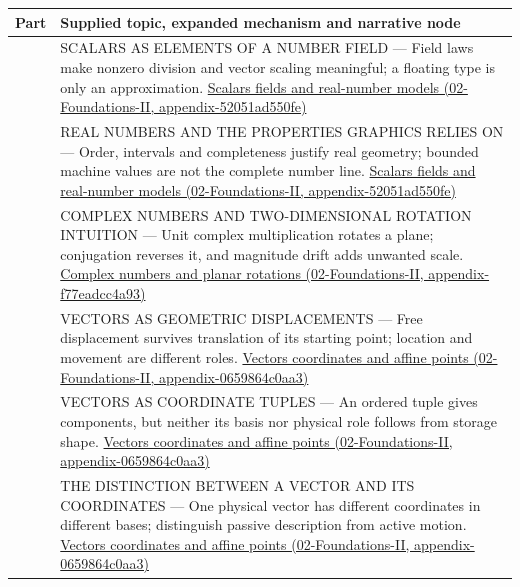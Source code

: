 {\def\LTcaptype{none} %
\begin{longtable}[]{@{}
  >{\raggedright\arraybackslash}p{}
  >{\raggedright\arraybackslash}p{}@{}}
\toprule\noalign{}
\begin{minipage}[b]{\linewidth}\raggedright
Part
\end{minipage} & \begin{minipage}[b]{\linewidth}\raggedright
Supplied topic, expanded mechanism and narrative node
\end{minipage} \\
\midrule\noalign{}
\endhead
\bottomrule\noalign{}
\endlastfoot
501 & SCALARS AS ELEMENTS OF A NUMBER FIELD --- Field laws make nonzero division and vector scaling meaningful; a floating type is only an approximation. \href{../02-Foundations-II/main.pdf\#nameddest=appendix-52051ad550fe}{Scalars fields and real-number models (02-Foundations-II, appendix-52051ad550fe)} \\
502 & REAL NUMBERS AND THE PROPERTIES GRAPHICS RELIES ON --- Order, intervals and completeness justify real geometry; bounded machine values are not the complete number line. \href{../02-Foundations-II/main.pdf\#nameddest=appendix-52051ad550fe}{Scalars fields and real-number models (02-Foundations-II, appendix-52051ad550fe)} \\
503 & COMPLEX NUMBERS AND TWO-DIMENSIONAL ROTATION INTUITION --- Unit complex multiplication rotates a plane; conjugation reverses it, and magnitude drift adds unwanted scale. \href{../02-Foundations-II/main.pdf\#nameddest=appendix-f77eadcc4a93}{Complex numbers and planar rotations (02-Foundations-II, appendix-f77eadcc4a93)} \\
504 & VECTORS AS GEOMETRIC DISPLACEMENTS --- Free displacement survives translation of its starting point; location and movement are different roles. \href{../02-Foundations-II/main.pdf\#nameddest=appendix-0659864c0aa3}{Vectors coordinates and affine points (02-Foundations-II, appendix-0659864c0aa3)} \\
505 & VECTORS AS COORDINATE TUPLES --- An ordered tuple gives components, but neither its basis nor physical role follows from storage shape. \href{../02-Foundations-II/main.pdf\#nameddest=appendix-0659864c0aa3}{Vectors coordinates and affine points (02-Foundations-II, appendix-0659864c0aa3)} \\
506 & THE DISTINCTION BETWEEN A VECTOR AND ITS COORDINATES --- One physical vector has different coordinates in different bases; distinguish passive description from active motion. \href{../02-Foundations-II/main.pdf\#nameddest=appendix-0659864c0aa3}{Vectors coordinates and affine points (02-Foundations-II, appendix-0659864c0aa3)} \\

\end{longtable}}
